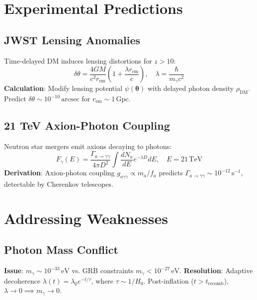 \documentclass[12pt, a4paper]{article}
\begin{document}
\section{Experimental Predictions}  
\label{sec:experiments}  

\subsection{JWST Lensing Anomalies}  
\label{subsec:lensing}  
Time-delayed DM induces lensing distortions for \( z > 10 \):  
\begin{equation}  
\delta \theta = \frac{4GM}{c^2 r_{\text{em}}} \left(1 + \frac{\lambda r_{\text{em}}}{c}\right), \quad \lambda = \frac{\hbar}{m_\gamma c^2}  
\label{eq:lensing}  
\end{equation}  
\textbf{Calculation}: Modify lensing potential \( \psi(\bm{\theta}) \) with delayed photon density \( \rho_{\text{DM}} \). Predict \( \delta \theta \sim 10^{-10} \, \text{arcsec} \) for \( r_{\text{em}} \sim 1 \, \text{Gpc} \).  

\subsection{21 TeV Axion-Photon Coupling}  
\label{subsec:axion}  
Neutron star mergers emit axions decaying to photons:  
\begin{equation}  
F_{\gamma}(E) = \frac{\Gamma_{a \to \gamma\gamma}}{4\pi D^2} \int \frac{dN_a}{dE} e^{-\lambda D} dE, \quad E = 21 \, \text{TeV}  
\label{eq:axion_flux}  
\end{equation}  
\textbf{Derivation}: Axion-photon coupling \( g_{a\gamma\gamma} \propto m_a / f_a \) predicts \( \Gamma_{a \to \gamma\gamma} \sim 10^{-12} \, \text{s}^{-1} \), detectable by Cherenkov telescopes.  

\section{Addressing Weaknesses}  
\label{sec:weaknesses}  

\subsection{Photon Mass Conflict}  
\label{subsec:photon_mass}  
\textbf{Issue}: \( m_\gamma \sim 10^{-33} \, \text{eV} \) vs. GRB constraints \( m_\gamma < 10^{-27} \, \text{eV} \).  
\textbf{Resolution}: Adaptive decoherence \( \lambda(t) = \lambda_0 e^{-t/\tau} \), where \( \tau \sim 1/H_0 \). Post-inflation (\( t > t_{\text{recomb}} \)), \( \lambda \to 0 \implies m_\gamma \to 0 \).  
\end{document}
